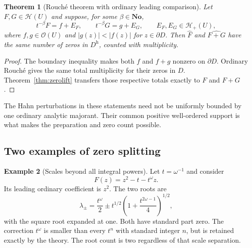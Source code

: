 \documentclass[11pt,a4paper]{article}
\newtheorem{theorem}{Theorem}[section]
\theoremstyle{definition}\newtheorem{definition}[theorem]{Definition}
\newtheorem{example}[theorem]{Example}
\theoremstyle{remark}\newtheorem{remark}[theorem]{Remark}
\newcommand{\No}{\mathbf{No}}
\newcommand{\A}{\mathscr H}\newcommand{\hol}{\mathcal O}
\newcommand{\ev}[1]{\widehat{#1}}
\newcommand{\halo}[1]{#1^{\mathrm h}}
\numberwithin{equation}{section}
\begin{document}
\begin{theorem}[Rouch\'e theorem with ordinary leading comparison]\label{thm:Rouche}
Let $F,G\in\A(U)$ and suppose, for some $\beta\in\No$,
\[
 t^{-\beta}F=f+E_F,\qquad
 t^{-\beta}G=g+E_G,\qquad E_F,E_G\in\A_+(U),
\]
where $f,g\in\hol(U)$ and
$|g(z)|<|f(z)|$ for $z\in\partial D$. Then $\ev F$ and $\ev{F+G}$ have the same number of zeros in $\halo D$, counted with multiplicity.
\end{theorem}
\begin{proof}
The boundary inequality makes both $f$ and $f+g$ nonzero on $\partial D$. Ordinary Rouch\'e gives the same total multiplicity for their zeros in $D$. Theorem~\ref{thm:zerolift} transfers those respective totals exactly to $F$ and $F+G$.
\end{proof}
The Hahn perturbations in these statements need not be uniformly bounded by one ordinary analytic majorant. Their common positive well-ordered support is what makes the preparation and zero count possible.

\subsection{Two examples of zero splitting}
\begin{example}[Scales beyond all integral powers]\label{ex:twoscale}
Let $t=\omega^{-1}$ and consider
\[
 F(z)=z^2-t-t^\omega z.
\]
Its leading ordinary coefficient is $z^2$. The two roots are
\[
 \lambda_\pm=\frac{t^\omega}{2}
 \pm t^{1/2}\left(1+\frac{t^{2\omega-1}}4\right)^{1/2},
\]
with the square root expanded at one. Both have standard part zero. The correction $t^\omega$ is smaller than every $t^n$ with standard integer $n$, but is retained exactly by the theory. The root count is two regardless of that scale separation.
\end{example}
\end{document}
